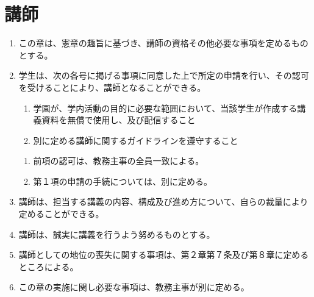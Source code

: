 \newpage
\chapter{講師}
\begin{enumerate}[label=第\arabic*条　]
  \item この章は、憲章の趣旨に基づき、講師の資格その他必要な事項を定めるものとする。
  \item 学生は、次の各号に掲げる事項に同意した上で所定の申請を行い、その認可を受けることにより、講師となることができる。
      \begin{enumerate}[label=(\arabic*)　]
        \item 学園が、学内活動の目的に必要な範囲において、当該学生が作成する講義資料を無償で使用し、及び配信すること
        \item 別に定める講師に関するガイドラインを遵守すること
      \end{enumerate}
    \begin{enumerate}[label=\arabic*　,start=2,leftmargin=*]
      \item 前項の認可は、教務主事の全員一致による。
      \item 第１項の申請の手続については、別に定める。
    \end{enumerate}
  \item 講師は、担当する講義の内容、構成及び進め方について、自らの裁量により定めることができる。
  \item 講師は、誠実に講義を行うよう努めるものとする。
  \item 講師としての地位の喪失に関する事項は、第２章第７条及び第８章に定めるところによる。
  \item この章の実施に関し必要な事項は、教務主事が別に定める。
\end{enumerate}
